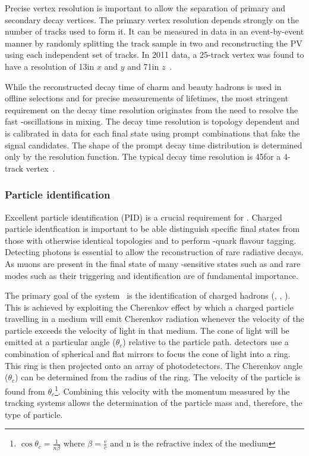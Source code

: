 Precise vertex resolution is important to allow the separation of primary and secondary decay vertices. The primary vertex resolution depends strongly on the number of tracks used to form it. It can be measured in data in an event-by-event manner by randomly splitting the track sample in two and reconstructing the PV using each independent set of tracks. In 2011 data, a 25-track vertex was found to have a resolution of 13\mum in $x$ and $y$  and 71\mum in $z$~\cite{lhcb-perf}.
 
While the reconstructed decay time of charm and beauty hadrons is used in offline selections and for precise measurements of lifetimes, the most stringent requirement on the decay time resolution originates from the need to resolve the fast \Bs-\Bsb oscillations in mixing. The decay time resolution is topology dependent and is calibrated in data for each final state using prompt combinations that fake the signal candidates. The shape of the prompt decay time distribution is determined only by the resolution function. The typical decay time resolution is 45\fs for a 4-track vertex~\cite{lhcb-perf}.

\subsubsection{Particle identification}
\label{sec:lhcb:pid}

Excellent particle identification (PID) is a crucial requirement for \lhcb. Charged particle identfication is important to be able distinguish specific final states from those with otherwise identical topologies and to perform \bquark-quark flavour tagging. Detecting photons is essential to allow the reconstruction of rare radiative decays. As muons are present in the final state of many \CP-sensitive states such as \BsToJPsiPhi and rare modes such as \BsToMuMu their triggering and identification are of fundamental importance.

The primary goal of the \rich system~\cite{lhcb-tdr,rich-perf} is the identification of charged hadrons (\pion, \kaon, \proton). This is achieved by exploiting the Cherenkov effect by which a charged particle travelling in a medium will emit Cherenkov radiation whenever the velocity of the particle exceeds the velocity of light in that medium. The cone of light will be emitted at a particular angle ($\theta_{c}$) relative  to the particle path. \rich detectors use a combination of spherical and flat mirrors to focus the cone of light into a ring. This ring is then projected onto an array of photodetectors. The Cherenkov angle ($\theta_{c}$) can be determined from the radius of the ring. The velocity of the particle is found from $\theta_{c}$\footnote{$\cos\theta_{c} = \frac{1}{n\beta}$ where $\beta = \frac{v}{c}$ and n is the refractive index of the medium}. Combining this velocity with the momentum measured by the tracking systems allows the determination of the particle mass and, therefore, the type of particle. 

